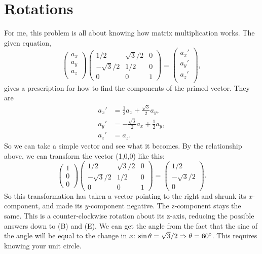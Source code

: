 \documentclass[11pt]{paper}
\begin{document}
\section{Rotations}
For me, this problem is all about knowing how matrix multiplication works.  The given equation,
\begin{equation}
\begin{pmatrix}
a_x\\
a_y\\
a_z\\
\end{pmatrix}
\begin{pmatrix}
1/2 & \sqrt{3}/2 & 0\\
-\sqrt{3}/2 & 1/2 & 0\\
0 & 0 &1
\end{pmatrix}
=
\begin{pmatrix}
a_x'\\
a_y'\\
a_z'\\
\end{pmatrix},
\end{equation}
gives a prescription for how to find the components of the primed vector.  They are
\begin{align}
a_x' &= \frac{1}{2}a_x + \frac{\sqrt{3}}{2}a_y, \\
 a_y' &= -\frac{\sqrt{3}}{2}a_x + \frac{1}{2}a_y,\\
 a_z' &= a_z.
\end{align}
So we can take a simple vector and see what it becomes.  By the relationship above, we can transform the vector (1,0,0) like this:
\begin{equation}
\begin{pmatrix}
1\\
0\\
0
\end{pmatrix}
\begin{pmatrix}
1/2 & \sqrt{3}/2 & 0\\
-\sqrt{3}/2 & 1/2 & 0\\
0 & 0 &1
\end{pmatrix}
=
\begin{pmatrix}
1/2\\
-\sqrt{3}/2\\
0
\end{pmatrix}.
\end{equation}
So this transformation has taken a vector pointing to the right and shrunk its $x$-component, and made its $y$-component negative.  The z-component stays the same.  This is a counter-clockwise rotation about its z-axis, reducing the possible answers down to (B) and (E).  We can get the angle from the fact that the sine of the angle will be equal to the change in $x$: $\sin{\theta} = \sqrt{3}/2 \Rightarrow \theta = 60\degree$.  This requires knowing your unit circle.\\
\end{document}
